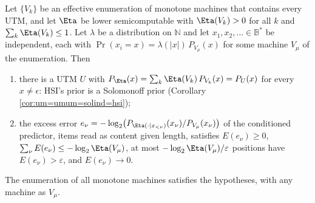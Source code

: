 \begin{theorem}
\label{thm:hsi-machines}
Let $\{V_k\}$ be an effective enumeration of monotone machines that contains every UTM, and let $\Eta$ be lower semicomputable with $\Eta(V_k)>0$ for all $k$ and $\sum_k\Eta(V_k)\le 1$. Let $\lambda$ be a distribution on $\mathbb{N}$ and let $x_1,x_2,\dots\in\mathbb{B}^*$ be independent, each with $\Pr(x_i=x)=\lambda(|x|)\,P_{V_\mu}(x)$ for some machine $V_\mu$ of the enumeration. Then
\begin{enumerate}
    \item[(a)] there is a UTM $U$ with $P_\Eta(x)=\sum_k\Eta(V_k)\,P_{V_k}(x)=P_U(x)$ for every $x\ne\epsilon$: HSI's prior is a Solomonoff prior (Corollary \ref{cor:um=umum=solind=hsi});
    \item[(b)] the excess error $e_\nu=-\log_2\bigl(P_{\Eta(\cdot\mid x_{<\nu})}(x_\nu)/P_{V_\mu}(x_\nu)\bigr)$ of the conditioned predictor, items read as content given length, satisfies $E(e_\nu)\ge 0$, $\sum_\nu E(e_\nu)\le-\log_2\Eta(V_\mu)$, at most $-\log_2\Eta(V_\mu)/\varepsilon$ positions have $E(e_\nu)>\varepsilon$, and $E(e_\nu)\to 0$.
\end{enumerate}
The enumeration of all monotone machines satisfies the hypotheses, with any machine as $V_\mu$.
\end{theorem}
